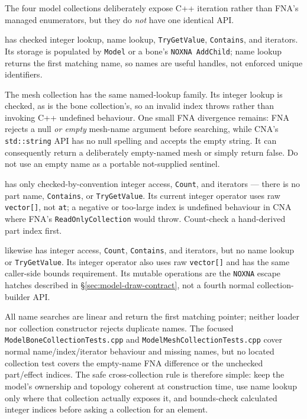 The four model collections deliberately expose C++ iteration rather than FNA's managed
enumerators, but they do \emph{not} have one identical API.

 has checked integer lookup, name lookup,
\texttt{TryGetValue}, \texttt{Contains}, and iterators.
Its storage is populated by \texttt{Model} or a bone's \texttt{NOXNA AddChild};
name lookup returns the first matching name, so names are useful handles, not enforced unique
identifiers.

The mesh collection has the same named-lookup family. Its integer lookup is checked, as is the
bone collection's, so an invalid index throws rather than invoking C++ undefined behaviour.
One small FNA divergence remains: FNA rejects a null \emph{or empty} mesh-name argument before
searching, while CNA's \texttt{std::string} API has no null spelling and accepts the empty
string. It can consequently return a deliberately empty-named mesh or simply return false.
Do not use an empty name as a portable not-supplied sentinel.

 has only checked-by-convention integer access,
\texttt{Count}, and iterators --- there is no part name, \texttt{Contains}, or
\texttt{TryGetValue}. Its current integer operator uses raw \texttt{vector[]}, not
\texttt{at}; a negative or too-large index is undefined behaviour in CNA where FNA's
\texttt{ReadOnlyCollection} would throw. Count-check a hand-derived part index first.

 likewise has integer access, \texttt{Count},
\texttt{Contains}, and iterators, but no name lookup or \texttt{TryGetValue}. Its
integer operator also uses raw \texttt{vector[]} and has the same caller-side bounds
requirement. Its mutable operations are the \texttt{NOXNA} escape hatches described in
\S\ref{sec:model-draw-contract}, not a fourth normal collection-builder API.

All name searches are linear and return the first matching pointer; neither loader nor
collection constructor rejects duplicate names. The focused \texttt{ModelBoneCollectionTests.cpp}
and \texttt{ModelMeshCollectionTests.cpp} cover normal name/index/iterator behaviour and missing
names, but no located collection test covers the empty-name FNA difference or the unchecked
part/effect indices. The safe cross-collection rule is therefore simple: keep the model's
ownership and topology coherent at construction time, use name lookup only where that collection
actually exposes it, and bounds-check calculated integer indices before asking a collection for
an element.
